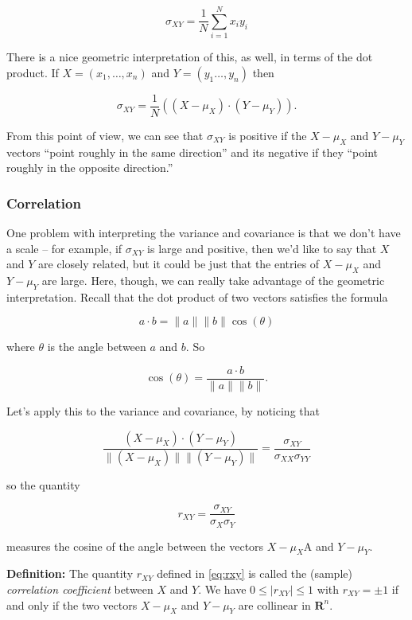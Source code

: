 \documentclass[]{article}
\begin{document}
\begin{equation}
\sigma_{XY} = \frac{1}{N}\sum_{i=1}^{N} x_iy_i
\label{eq:covariancedot}\end{equation}

There is a nice geometric interpretation of this, as well, in terms of
the dot product. If \(X=(x_1,\ldots, x_n)\) and \(Y=(y_1\ldots,y_n)\)
then

\[
\sigma_{XY} = \frac{1}{N} ((X-\mu_{X})\cdot (Y-\mu_{Y})).
\]

From this point of view, we can see that \(\sigma_{XY}\) is positive if
the \(X-\mu_{X}\) and \(Y-\mu_{Y}\) vectors ``point roughly in the same
direction'' and its negative if they ``point roughly in the opposite
direction.''

\hypertarget{correlation}{%
\subsubsection{Correlation}\label{correlation}}

One problem with interpreting the variance and covariance is that we
don't have a scale -- for example, if \(\sigma_{XY}\) is large and
positive, then we'd like to say that \(X\) and \(Y\) are closely
related, but it could be just that the entries of \(X-\mu_{X}\) and
\(Y-\mu_{Y}\) are large. Here, though, we can really take advantage of
the geometric interpretation. Recall that the dot product of two vectors
satisfies the formula

\[
a \cdot b = \|a\|\|b\|\cos(\theta)
\]

where \(\theta\) is the angle between \(a\) and \(b\). So

\[
\cos(\theta) = \frac{a\cdot b}{\|a\|\|b\|}.
\]

Let's apply this to the variance and covariance, by noticing that

\[
\frac{(X-\mu_{X})\cdot (Y-\mu_{Y})}{\|(X-\mu_{X})\|\|(Y-\mu_{Y})\|} = \frac{\sigma_{XY}}{\sigma_{XX}\sigma_{YY}}
\]

so the quantity

\begin{equation}
r_{XY} = \frac{\sigma_{XY}}{\sigma_{X}\sigma_{Y}}
\label{eq:rxy}\end{equation}

measures the cosine of the angle between the vectors \(X-\mu_{X}\)A and
\(Y-\mu_{Y}\).

\textbf{Definition:} The quantity \(r_{XY}\) defined in \cref{eq:rxy} is
called the (sample) \emph{correlation coefficient} between \(X\) and
\(Y\). We have \(0\le |r_{XY}|\le 1\) with \(r_{XY}=\pm 1\) if and only
if the two vectors \(X-\mu_{X}\) and \(Y-\mu_{Y}\) are collinear in
\(\mathbf{R}^{n}\).
\end{document}
